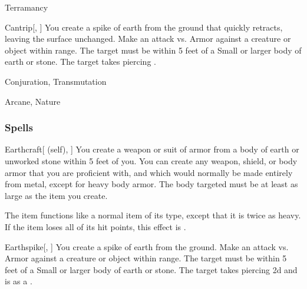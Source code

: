 \newpage
\begin{spellsection}{Terramancy}

\begin{spellheader}
\end{spellheader}


\begin{ability}{Cantrip}[, ]
You create a spike of earth from the ground that quickly retracts, leaving the surface unchanged.
Make an attack vs. Armor against a creature or object within \rngclose range.
The target must be within 5 feet of a Small or larger body of earth or stone.
\hit The target takes piercing .
\end{ability}




 Conjuration, Transmutation

 Arcane, Nature
\end{spellsection}


\subsubsection{Spells}


\begin{ability}[\nth{1}]{Earthcraft}[ (self), ]
You create a weapon or suit of armor from a body of earth or unworked stone within 5 feet of you.
You can create any weapon, shield, or body armor that you are proficient with, and which would normally be made entirely from metal, except for heavy body armor.
The body targeted must be at least as large as the item you create.

The item functions like a normal item of its type, except that it is twice as heavy.
If the item loses all of its hit points, this effect is .
\end{ability}
\vspace{0.25em}



\begin{ability}[\nth{1}]{Earthspike}[, ]
You create a spike of earth from the ground.
Make an attack vs. Armor against a creature or object within \rngclose range.
The target must be within 5 feet of a Small or larger body of earth or stone.
\hit The target takes piercing  \plus2d and is  as a .
\end{ability}
\vspace{0.25em}



